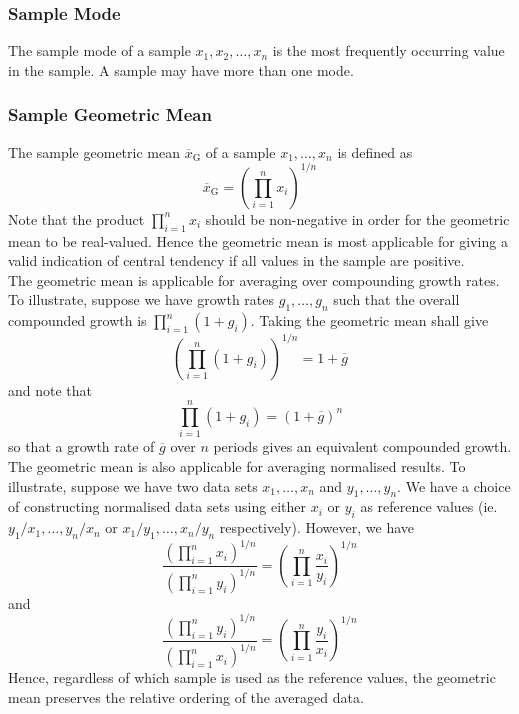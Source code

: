 \documentclass[11pt]{report} %
\begin{document}
\subsubsection{Sample Mode}

The sample mode of a sample $x_{1}, x_{2}, \dots, x_{n}$ is the most frequently occurring value in the sample. A sample may have more than one mode.

\subsubsection{Sample Geometric Mean}

The sample geometric mean $\overline{x}_{\mathrm{G}}$ of a sample $x_{1}, \dots, x_{n}$ is defined as
\begin{equation}
\overline{x}_{\mathrm{G}} = \left(\prod_{i = 1}^{n}x_{i}\right)^{1/n}
\end{equation}
Note that the product $\prod_{i = 1}^{n}x_{i}$ should be non-negative in order for the geometric mean to be real-valued. Hence the geometric mean is most applicable for giving a valid indication of central tendency if all values in the sample are positive. \\

The geometric mean is applicable for averaging over compounding growth rates. To illustrate, suppose we have growth rates $g_{1}, \dots, g_{n}$ such that the overall compounded growth is $\prod_{i = 1}^{n}\left(1 + g_{i}\right)$. Taking the geometric mean shall give
\begin{equation}
\left(\prod_{i = 1}^{n}\left(1 + g_{i}\right)\right)^{1/n} = 1 + \overline{g}
\end{equation}
and note that
\begin{equation}
\prod_{i = 1}^{n}\left(1 + g_{i}\right) = \left(1 + \overline{g}\right)^{n}
\end{equation}
so that a growth rate of $\overline{g}$ over $n$ periods gives an equivalent compounded growth. \\

The geometric mean is also applicable for averaging normalised results. To illustrate, suppose we have two data sets $x_{1}, \dots, x_{n}$ and $y_{1}, \dots, y_{n}$. We have a choice of constructing normalised data sets using either $x_{i}$ or $y_{i}$ as reference values (ie. $y_{1}/x_{1}, \dots, y_{n}/x_{n}$ or $x_{1}/y_{1}, \dots, x_{n}/y_{n}$ respectively). However, we have
\begin{equation}
\dfrac{\left(\prod_{i = 1}^{n}x_{i}\right)^{1/n}}{\left(\prod_{i = 1}^{n}y_{i}\right)^{1/n}} = \left(\prod_{i = 1}^{n}\dfrac{x_{i}}{y_{i}}\right)^{1/n}
\end{equation}
and
\begin{equation}
\dfrac{\left(\prod_{i = 1}^{n}y_{i}\right)^{1/n}}{\left(\prod_{i = 1}^{n}x_{i}\right)^{1/n}} = \left(\prod_{i = 1}^{n}\dfrac{y_{i}}{x_{i}}\right)^{1/n}
\end{equation}
Hence, regardless of which sample is used as the reference values, the geometric mean preserves the relative ordering of the averaged data.
\end{document}
